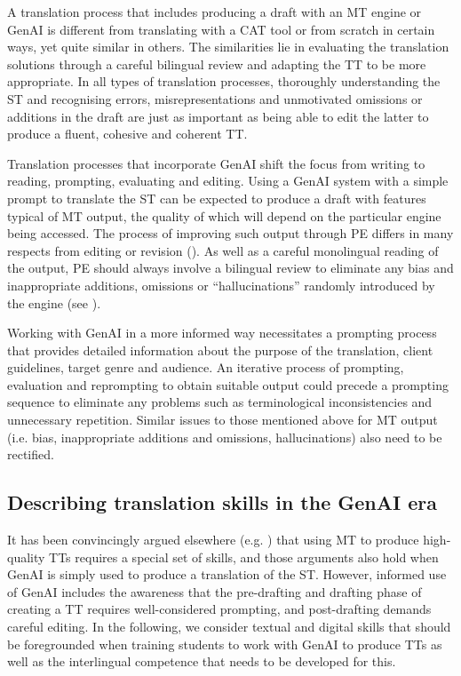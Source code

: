 \documentclass[output=paper]{langscibook}
\begin{document}
A translation process that includes producing a draft with an MT engine or GenAI is different from translating with a CAT tool or from scratch in certain ways, yet quite similar in others. The similarities lie in evaluating the translation solutions through a careful bilingual review and adapting the TT to be more appropriate. In all types of translation processes, thoroughly understanding the ST and recognising errors, misrepresentations and unmotivated omissions or additions in the draft are just as important as being able to edit the latter to produce a fluent, cohesive and coherent TT. 

Translation processes that incorporate GenAI shift the focus from writing to reading, prompting, evaluating and editing. Using a GenAI system with a simple prompt to translate the ST can be expected to produce a draft with features typical of MT output, the quality of which will depend on the particular engine being accessed. The process of improving such output through PE differs in many respects from editing or revision (\citealt{do_carmo_differentiating_2021}). As well as a careful monolingual reading of the output, PE should always involve a bilingual review to eliminate any bias and inappropriate additions, omissions or “hallucinations” randomly introduced by the engine (see \citealt{dale_detecting_2023}). 

Working with GenAI in a more informed way necessitates a prompting process that provides detailed information about the purpose of the translation, client guidelines, target genre and audience. An iterative process of prompting, evaluation and reprompting to obtain suitable output could precede a prompting sequence to eliminate any problems such as terminological inconsistencies and unnecessary repetition. Similar issues to those mentioned above for MT output (i.e. bias, inappropriate additions and omissions, hallucinations) also need to be rectified. 

\subsection{Describing translation skills in the GenAI era}

It has been convincingly argued elsewhere (e.g. \citealt{nitzke_short_2021, obrien_post-editing_2021}) that using MT to produce high-quality TTs requires a special set of skills, and those arguments also hold when GenAI is simply used to produce a translation of the ST. However, informed use of GenAI includes the awareness that the pre-drafting and drafting phase of creating a TT requires well-considered prompting, and post-drafting demands careful editing. In the following, we consider textual and digital skills that should be foregrounded when training students to work with GenAI to produce TTs as well as the interlingual competence that needs to be developed for this.
\end{document}
